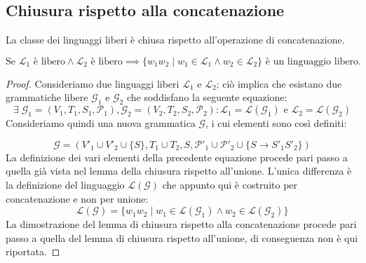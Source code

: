 \documentclass[class=book, crop=false, oneside, 12pt]{standalone}
\begin{document}
\subsection*{Chiusura rispetto alla concatenazione}

\begin{lemma}
  La classe dei linguaggi liberi è chiusa rispetto all'operazione di concatenazione.

  \begin{equation*}
    \textrm{Se } \mathcal{L}_1 \textrm{ è libero} \land \mathcal{L}_2 \textrm{ è libero} \implies \{w_1w_2 \mid w_1 \in \mathcal{L}_1 \land w_2 \in \mathcal{L}_2\} \textrm{ è un linguaggio libero.}
  \end{equation*}

\end{lemma}

\begin{proof}%
  Consideriamo due linguaggi liberi \(\mathcal{L}_1\) e \(\mathcal{L}_2\); ciò implica che esistano due grammatiche libere \(\mathcal{G}_1\) e \(\mathcal{G}_2\) che soddisfano la seguente equazione:
  \begin{equation*}
    \exists\; \mathcal{G}_1 = (V_1, T_1, S_1, \mathcal{P}_1), \mathcal{G}_2 = (V_2, T_2, S_2, \mathcal{P}_2) : \mathcal{L}_1 = \mathcal{L}(\mathcal{G}_1) \textrm{ e } \mathcal{L}_2 = \mathcal{L}(\mathcal{G}_2)
  \end{equation*}
  Consideriamo quindi una nuova grammatica \(\mathcal{G}\), i cui elementi sono così definiti:

  \begin{equation*}
      \mathcal{G} = (V'_1 \cup V'_2 \cup \{S\}, T_1 \cup T_2, S, \mathcal{P}'_1 \cup \mathcal{P}'_2 \cup \{S \rightarrow S'_1 S'_2\})
  \end{equation*}
  La definizione dei vari elementi della precedente equazione procede pari passo a quella già vista nel lemma della chiusura rispetto all'unione.
  L'unica differenza è la definizione del linguaggio \(\mathcal{L}(\mathcal{G})\) che appunto qui è costruito per concatenazione e non per unione:
  \begin{equation*}
    \mathcal{L(G)} = \{w_1 w_2 \mid w_1 \in \mathcal{L}(\mathcal{G}_1) \land w_2 \in \mathcal{L}(\mathcal{G}_2) \}
  \end{equation*}
  La dimostrazione del lemma di chiusura rispetto alla concatenazione procede pari passo a quella del lemma di chiusura rispetto all'unione, di conseguenza non è qui riportata. 
\end{proof}
\end{document}
